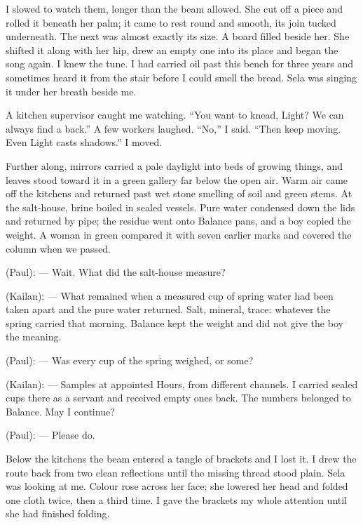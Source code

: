 I slowed to watch them, longer than the beam allowed. She cut off a piece and rolled it beneath her palm; it came to rest round and smooth, its join tucked underneath. The next was almost exactly its size. A board filled beside her. She shifted it along with her hip, drew an empty one into its place and began the song again. I knew the tune. I had carried oil past this bench for three years and sometimes heard it from the stair before I could smell the bread. Sela was singing it under her breath beside me.\par

A kitchen supervisor caught me watching. ``You want to knead, Light? We can always find a back.'' A few workers laughed. ``No,'' I said. ``Then keep moving. Even Light casts shadows.'' I moved.\par

Further along, mirrors carried a pale daylight into beds of growing things, and leaves stood toward it in a green gallery far below the open air. Warm air came off the kitchens and returned past wet stone smelling of soil and green stems. At the salt-house, brine boiled in sealed vessels. Pure water condensed down the lids and returned by pipe; the residue went onto Balance pans, and a boy copied the weight. A woman in green compared it with seven earlier marks and covered the column when we passed.\par

\begin{room}

(Paul): --- Wait. What did the salt-house measure?

(Kailan): --- What remained when a measured cup of spring water had been taken apart and the pure water returned. Salt, mineral, trace: whatever the spring carried that morning. Balance kept the weight and did not give the boy the meaning.

(Paul): --- Was every cup of the spring weighed, or some?

(Kailan): --- Samples at appointed Hours, from different channels. I carried sealed cups there as a servant and received empty ones back. The numbers belonged to Balance. May I continue?

(Paul): --- Please do. 

\end{room}

Below the kitchens the beam entered a tangle of brackets and I lost it. I drew the route back from two clean reflections until the missing thread stood plain. Sela was looking at me. Colour rose across her face; she lowered her head and folded one cloth twice, then a third time. I gave the brackets my whole attention until she had finished folding.\par

